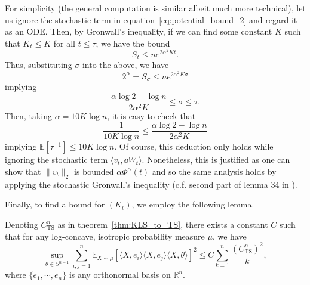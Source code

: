 For simplicity (the general computation is similar albeit much more technical), let us ignore the stochastic term in 
equation~\eqref{eq:potential_bound_2} and regard it as an ODE. Then, by Gronwall's inequality, if we can 
find some constant \(K\) such that \(K_t \le K\) for all \(t \le \tau\), we have the bound
\[S_t \le n e^{2\alpha^2 K t}.\]
Thus, substituting \(\sigma\) into the above, we have 
\[2^\alpha = S_\sigma \le ne^{2\alpha^2 K\sigma}\]
implying 
\[\frac{\alpha \log 2 - \log n}{2\alpha^2 K} \le \sigma \le \tau.\]
Then, taking \(\alpha = 10K\log n\), it is easy to check that 
\[\frac{1}{10K \log n} \le \frac{\alpha \log 2 - \log n}{2\alpha^2 K}\]
implying \(\mathbb{E}[\tau^{-1}] \le 10K \log n\). Of course, this deduction only holds while ignoring the stochastic term 
\(\langle v_t, \dd W_t\rangle\). Nonetheless, this is justified as one can show that \(\|v_t\|_2\) is bounded 
\(\alpha \Phi^\alpha(t)\) and so the same analysis holds by applying the stochastic Gronwall's inequality
(c.f. second part of lemma 34 in \cite{Lee_2018}).

Finally, to find a bound for \((K_t)\), we employ the following lemma.

\begin{lemma}\label{lem:final_bd}
  Denoting \(C_{\text{TS}}^n\) as in theorem~\ref{thm:KLS_to_TS}, there exists a constant \(C\) such that 
  for any log-concave, isotropic probability measure \(\mu\), we have
  \[\sup_{\theta \in S^{n - 1}}\sum_{i, j = 1}^n 
    \mathbb{E}_{X \sim \mu}[\langle X, e_i\rangle \langle X, e_j\rangle \langle X, \theta\rangle]^2 \le 
    C \sum_{k = 1}^n \frac{(C_{\text{TS}}^n)^2}{k},\]
  where \(\{e_1, \cdots, e_n\}\) is any orthonormal basis on \(\mathbb{R}^n\).
\end{lemma}

